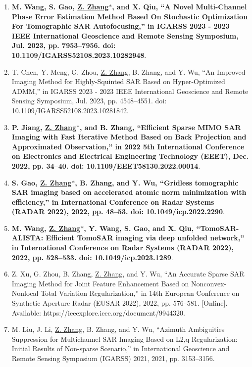 \documentclass[paper=a4,fontsize=11pt]{scrartcl}
\begin{document}
\begin{enumerate}
	
	\item \textbf{ M. Wang, S. Gao, \underline{Z. Zhang$\ast$}, and X. Qiu, ``A Novel Multi-Channel Phase Error Estimation Method Based On Stochastic Optimization For Tomographic SAR Autofocusing,'' in IGARSS 2023 - 2023 IEEE International Geoscience and Remote Sensing Symposium, Jul. 2023, pp. 7953–7956. doi: 10.1109/IGARSS52108.2023.10282948}.
	
	\item T. Chen, Y. Meng, G. Zhou, \underline{Z. Zhang}, B. Zhang, and Y. Wu, ``An Improved Imaging Method for Highly-Squinted SAR Based on Hyper-Optimized ADMM,'' in IGARSS 2023 - 2023 IEEE International Geoscience and Remote Sensing Symposium, Jul. 2023, pp. 4548–4551. doi: 10.1109/IGARSS52108.2023.10281842.
	
	\item \textbf{P. Jiang, \underline{Z. Zhang$\ast$}, and B. Zhang, ``Efficient Sparse MIMO SAR Imaging with Fast Iterative Method Based on Back Projection and Approximated Observation,'' in 2022 5th International Conference on Electronics and Electrical Engineering Technology (EEET), Dec. 2022, pp. 34–40. doi: 10.1109/EEET58130.2022.00014}.
	
	\item \textbf{S. Gao, \underline{Z. Zhang$\ast$}, B. Zhang, and Y. Wu, ``Gridless tomographic SAR imaging based on accelerated atomic norm minimization with efficiency,'' in International Conference on Radar Systems (RADAR 2022), 2022, pp. 48–53. doi: 10.1049/icp.2022.2290}.
	
	\item \textbf{M. Wang, \underline{Z. Zhang$\ast$}, Y. Wang, S. Gao, and X. Qiu, ``TomoSAR-ALISTA: Efficient TomoSAR imaging via deep unfolded network,'' in International Conference on Radar Systems (RADAR 2022), 2022, pp. 528–533. doi: 10.1049/icp.2023.1289}.
	
	\item Z. Xu, G. Zhou, B. Zhang, \underline{Z. Zhang}, and Y. Wu, ``An Accurate Sparse SAR Imaging Method for Joint Feature Enhancement Based on Nonconvex-Nonlocal Total Variation Regularization,'' in 14th European Conference on Synthetic Aperture Radar (EUSAR 2022), 2022, pp. 576–581. [Online]. Available: https://ieeexplore.ieee.org/document/9944320.
	
	\item M. Liu, J. Li, \underline{Z. Zhang}, B. Zhang, and Y. Wu, ``Azimuth Ambiguities Suppression for Multichannel SAR Imaging Based on L2,q Regularization: Initial Results of Non-sparse Scenario,'' in International Geoscience and Remote Sensing Symposium (IGARSS) 2021, 2021, pp. 3153–3156.
	

\end{enumerate}
\end{document}
